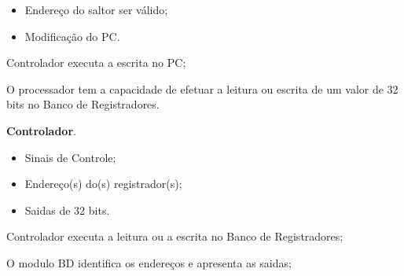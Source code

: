 \documentclass{article}
\begin{document}
  \preconditions 
    \begin{itemize}
     \item Endereço do saltor ser válido;
    \end{itemize}

  \postconditions
    \begin{itemize}
     \item Modificação do PC.
    \end{itemize}

  
  \begin{mainflow}
    \item Controlador executa a escrita no PC;
  \end{mainflow}  

   O processador tem a capacidade de efetuar a leitura ou escrita de um valor de 32 bits no Banco de Registradores.
  
  \actors
    \begin{description}
     \item \textbf{Controlador}.
    \end{description}
    
  \preconditions 
    \begin{itemize}
    \item Sinais de Controle;
    \item Endereço(s) do(s) registrador(s);
    \end{itemize}

  \postconditions
    \begin{itemize}
    \item Saidas de 32 bits.
    \end{itemize}

  
  \begin{mainflow}
    \item Controlador executa a leitura ou a escrita no Banco de Registradores;
    \item O modulo BD identifica os endereços e apresenta as saidas;
  \end{mainflow}  


 

% 
% 
\end{document}
